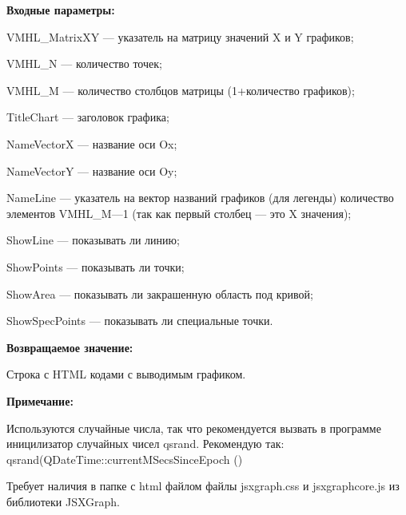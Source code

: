 \textbf{Входные параметры:}
 
    VMHL\_MatrixXY --- указатель на матрицу значений X и Y графиков;
 
    VMHL\_N --- количество точек;
 
    VMHL\_M --- количество столбцов матрицы (1+количество графиков);
 
    TitleChart --- заголовок графика;
 
    NameVectorX --- название оси Ox;
 
    NameVectorY --- название оси Oy;
 
    NameLine --- указатель на вектор названий графиков (для легенды) количество элементов VMHL\_M---1 (так как первый столбец --- это X значения);
 
    ShowLine --- показывать ли линию;
 
    ShowPoints --- показывать ли точки;
 
    ShowArea --- показывать ли закрашенную область под кривой;
 
    ShowSpecPoints --- показывать ли специальные точки.

\textbf{Возвращаемое значение:}

Строка с HTML кодами с выводимым графиком.

\textbf{Примечание:}

Используются случайные числа, так что рекомендуется вызвать в программе иницилизатор случайных чисел qsrand. Рекомендую так: qsrand(QDateTime::currentMSecsSinceEpoch () %

Требует наличия в папке с html файлом файлы jsxgraph.css и jsxgraphcore.js из библиотеки JSXGraph.